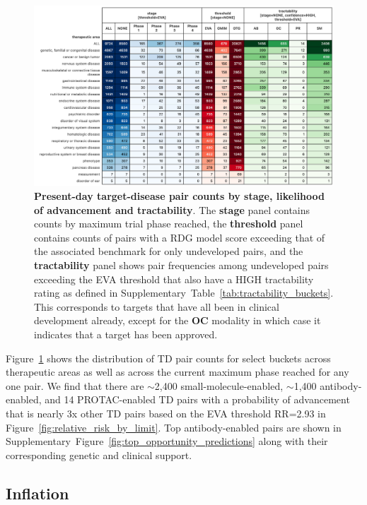 \documentclass{article}
\begin{document}
\begin{figure}[!htb]
  \centering
  \captionsetup{width=.9\linewidth}
  \includegraphics[width=1\textwidth]{opportunity_summary.png}
  \caption{
    \textbf{Present-day target-disease pair counts by stage, likelihood of advancement and tractability}. The \textbf{stage} panel contains counts by maximum trial phase reached, the \textbf{threshold} panel contains counts of pairs with a RDG model score exceeding that of the associated benchmark for only undeveloped pairs, and the \textbf{tractability} panel shows pair frequencies among undeveloped pairs exceeding the EVA threshold that also have a HIGH tractability rating as defined in Supplementary~Table~\ref{tab:tractability_buckets}. This corresponds to targets that have all been in clinical development already, except for the \textbf{OC} modality in which case it indicates that a target has been approved. 
  }
  \label{fig:opportunity_summary}
\end{figure}

Figure~\ref{fig:opportunity_summary} shows the distribution of TD pair counts for select buckets across therapeutic areas as well as across the current maximum phase reached for any one pair. We find that there are $\sim$2,400 small-molecule-enabled, $\sim$1,400 antibody-enabled, and 14 PROTAC-enabled TD pairs with a probability of advancement that is nearly 3x other TD pairs based on the EVA threshold RR=2.93 in Figure~\ref{fig:relative_risk_by_limit}. Top antibody-enabled pairs are shown in Supplementary~Figure~\ref{fig:top_opportunity_predictions} along with their corresponding genetic and clinical support.

\subsection{Inflation}
\label{sec:results_inflation}
\end{document}

